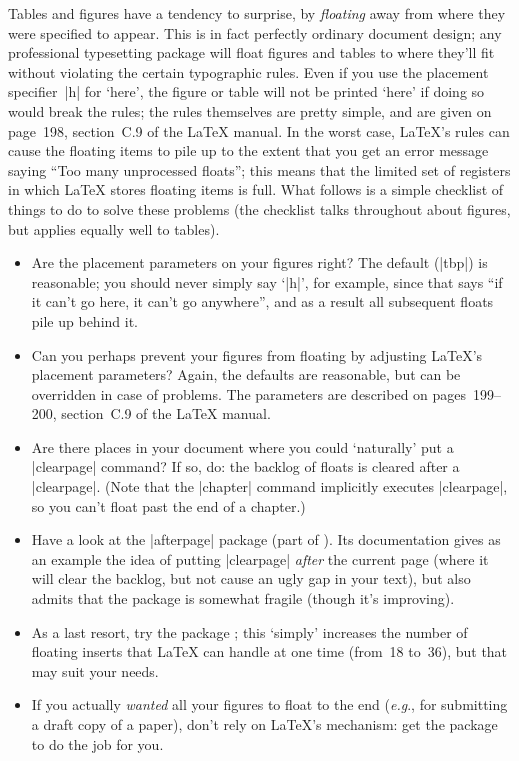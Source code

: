 \begin{changemargin}{-1cm}{-1cm}
Tables and figures have a tendency to surprise, by \emph{floating}
away from where they were specified to appear.  This is in fact
perfectly ordinary document design; any professional typesetting
package will float figures and tables to where they'll fit without
violating the certain typographic rules.  Even if you use the
placement specifier~|h| for `here', the figure or table will not be
printed `here' if doing so would break the rules; the rules themselves
are pretty simple, and are given on page~198, section~C.9 of the
\LaTeX{} manual.  In the worst case, \LaTeX{}'s rules can cause the
floating items to pile up to the extent that you get an error message
saying ``Too many unprocessed floats''; this means that the limited
set of registers in which \LaTeX{} stores floating items is full.
What follows is a simple checklist of things to do to solve these
problems (the checklist talks throughout about figures, but applies
equally well to tables).
\begin{itemize}
\item Are the placement parameters on your figures right?  The
  default (|tbp|) is reasonable; you should never simply say `|h|',
  for example, since that says ``if it can't go here, it can't go
  anywhere'', and as a result all subsequent floats pile up behind it.
\item Can you perhaps prevent your figures from floating by adjusting
  \LaTeX{}'s placement parameters?  Again, the defaults are
  reasonable, but can be overridden in case of problems.  The
  parameters are described on pages~199--200, section~C.9 of the
  \LaTeX{} manual.
\item Are there places in your document where you could `naturally'
  put a \cs|clearpage| command?  If so, do: the backlog of floats is
  cleared after a \cs|clearpage|.  (Note that the \cs|chapter|
  command implicitly executes \cs|clearpage|, so you can't float past
  the end of a chapter.)
\item Have a look at the \LaTeXe{} |afterpage| package (part of
  ).  Its documentation gives as an example the idea
  of putting \cs|clearpage| \emph{after} the current page (where it
  will clear the backlog, but not cause an ugly gap in your text), but
  also admits that the package is somewhat fragile (though it's improving).
\item As a last resort, try the package ; this
  `simply' increases the number of floating inserts that \LaTeX{} can
  handle at one time (from~18 to~36), but that may suit your needs.
\item If you actually \emph{wanted} all your figures to float to the
  end (\emph{e.g}., for submitting a draft copy of a paper), don't
  rely on \LaTeX{}'s mechanism: get the package  to do
  the job for you.
\end{itemize}


\end{changemargin}
